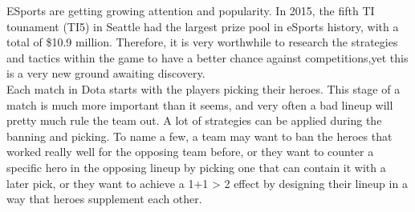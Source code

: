 \documentclass[landscape,a0paper,fontscale=0.285]{baposter} %
\begin{document}
\begin{poster}
{ESports are getting growing attention and popularity. In 2015, the fifth TI tounament (TI5) in Seattle had the largest prize pool in eSports history, with a total of \$10.9 million. Therefore, it is very worthwhile to research the strategies and tactics within the game to have a better chance against competitions,yet this is a very new ground awaiting discovery.\\
Each match in Dota starts with the players picking their heroes. This stage of a match is much more important than it seems, and very often a bad lineup will pretty much rule the team out. A lot of strategies can be applied during the banning and picking. To name a few, a team may want to ban the heroes that worked really
well for the opposing team before, or they want to counter a specific hero in the opposing
lineup by picking one that can contain it with a later pick, or they want to achieve a 1+1 > 2
effect by designing their lineup in a way that heroes supplement each other.  
}



\end{poster}
\end{document}
